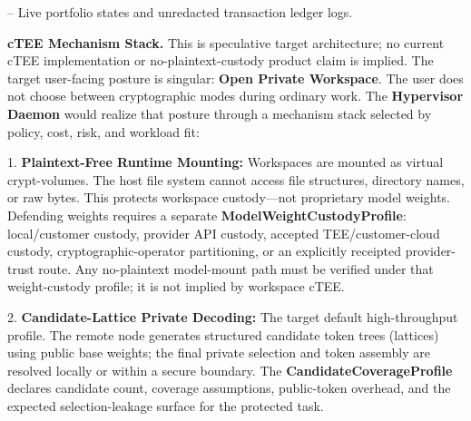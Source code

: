 \documentclass[
  11pt,
]{article}
\begin{document}
-- Live portfolio states and unredacted transaction ledger logs.


\begin{center}
\end{center}


\textbf{cTEE Mechanism Stack.} This is speculative target architecture; no
current cTEE implementation or no-plaintext-custody product claim is implied.
The target user-facing posture is singular:
\textbf{Open Private Workspace}. The user does not choose between
cryptographic modes during ordinary work. The \textbf{Hypervisor Daemon}
would realize that posture through a mechanism stack selected by policy,
cost, risk, and workload fit:

1. \textbf{Plaintext-Free Runtime Mounting:} Workspaces are mounted as
virtual crypt-volumes. The host file system cannot access file
structures, directory names, or raw bytes. This protects workspace
custody---not proprietary model weights. Defending weights requires a
separate \textbf{ModelWeightCustodyProfile}: local/customer custody,
provider API custody, accepted TEE/customer-cloud custody,
cryptographic-operator partitioning, or an explicitly receipted
provider-trust route. Any no-plaintext model-mount path must be verified
under that weight-custody profile; it is not implied by workspace cTEE.

2. \textbf{Candidate-Lattice Private Decoding:} The target default
high-throughput profile. The remote node generates structured candidate
token trees (lattices) using public base weights; the final private
selection and token assembly are resolved locally or within a secure
boundary. The \textbf{CandidateCoverageProfile} declares candidate count,
coverage assumptions, public-token overhead, and the expected
selection-leakage surface for the protected task.
\end{document}
